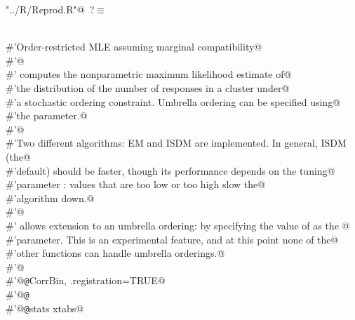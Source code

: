 \documentclass[reqno]{amsart}
\renewcommand{\NWtarget}[2]{\hypertarget{#1}{#2}}
\begin{document}
\begin{flushleft} \small\label{scrap8}\raggedright\small
\NWtarget{nuweb?}{} \verb@"../R/Reprod.R"@\nobreak\ {\footnotesize {?}}$\equiv$
\vspace{-1ex}
\begin{list}{}{} \item
\mbox{}\verb@@\\
\mbox{}\verb@#'Order-restricted MLE assuming marginal compatibility@\\
\mbox{}\verb@#'@\\
\mbox{}\verb@#' computes the nonparametric maximum likelihood estimate of@\\
\mbox{}\verb@#'the distribution of the number of responses in a cluster  under@\\
\mbox{}\verb@#'a stochastic ordering constraint. Umbrella ordering can be specified using@\\
\mbox{}\verb@#'the  parameter.@\\
\mbox{}\verb@#'@\\
\mbox{}\verb@#'Two different algorithms: EM and ISDM are implemented. In general, ISDM (the@\\
\mbox{}\verb@#'default) should be faster, though its performance depends on the tuning@\\
\mbox{}\verb@#'parameter : values that are too low or too high slow the@\\
\mbox{}\verb@#'algorithm down.@\\
\mbox{}\verb@#'@\\
\mbox{}\verb@#' allows extension to an umbrella ordering:  by specifying the value of  as the @\\
\mbox{}\verb@#'parameter. This is an experimental feature, and at this point none of the@\\
\mbox{}\verb@#'other functions can handle umbrella orderings.@\\
\mbox{}\verb@#'@\\
\mbox{}\verb@#'@{\tt @}\verb@useDynLib CorrBin, .registration=TRUE@\\
\mbox{}\verb@#'@{\tt @}\verb@export@\\
\mbox{}\verb@#'@{\tt @}\verb@importFrom stats xtabs@\\

\end{list}
\end{flushleft}
\end{document}
